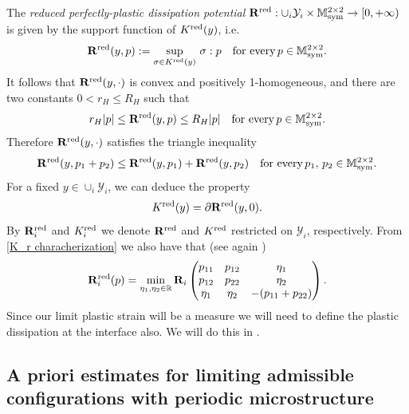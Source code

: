 \documentclass[reqno,10pt]{amsart}
\numberwithin{equation}{section}
\theoremstyle{remark}
\newcommand{\RED}{\color{black}}
\newcommand{\BLACK}{\color{black}}
\newcommand{\M}{\mathbb{M}}
\newcommand{\R}{\mathbb{R}}
\newcommand{\calY}{\mathcal{Y}}
\DeclareMathOperator{\sym}{sym}
\newcommand{\disspot}{\mathbf{R}}
\newcommand{\red}[1]{#1^{\rm red}}
\begin{document}
The \emph{reduced perfectly-plastic dissipation potential} $\red{\disspot} : \cup_i\calY_i \times \M^{2 \times 2}_{\sym} \to [0,+\infty)$ is given by the support function of $\red{K}(y)$, i.e.
\begin{equation*}
	\red{\disspot}(y, p) := \sup\limits_{\sigma \in \red{K}(y)}\, \sigma : p \quad \text{for every}\, p \in \M^{2 \times 2}_{\sym}.
\end{equation*}
It follows that $\red{\disspot}(y,\cdot)$ is convex and positively 1-homogeneous, and there are two constants $0 < r_H \leq R_H$ such that 
\begin{equation*}
	r_H |p| \leq \red{\disspot}(y, p) \leq R_H |p| \quad \text{for every}\, p \in \M^{2 \times 2}_{\sym}.
\end{equation*}
Therefore $\red{\disspot}(y,\cdot)$ satisfies the triangle inequality 
\begin{equation*}
\red{\disspot}(y, p_1+p_2) \leq \red{\disspot}(y, p_1) + \red{\disspot}(y, p_2) \quad \text{for every}\, p_1,\, p_2 \in \M^{2 \times 2}_{\sym}.
\end{equation*}
For a fixed $y \in \cup_i\calY_i$, we can deduce the property
\begin{equation*}
	\red{K}(y) = \partial \red{\disspot}(y, 0).
\end{equation*}
{\RED 
By $\red{\disspot}_i$ and $\red{K}_i$ we denote 
$\red{\disspot}$ and $\red{K}$ restricted on $\calY_i$, respectively.
From \eqref{K_r characherization} we also have that (see again \cite[Section 3.2]{Davoli.Mora.2013})
\begin{equation} \label{reference1}
    \red{\disspot}_i(p) = \min_{\eta_1,\eta_2 \in \R} \disspot_i 
    \begin{pmatrix}
        p_{11} & p_{12} & \eta_1 \\
        p_{12} & p_{22} & \eta_2 \\
        \eta_1 & \eta_2 & -(p_{11}+p_{22})
    \end{pmatrix}.
\end{equation}\BLACK}\noindent
Since our limit plastic strain will be a measure we will need to define the plastic dissipation at the interface also. We will do this in . 

\subsection{A priori estimates for limiting admissible configurations with periodic microstructure} \label{A priori estimates with vanishing hardening}
\end{document}
